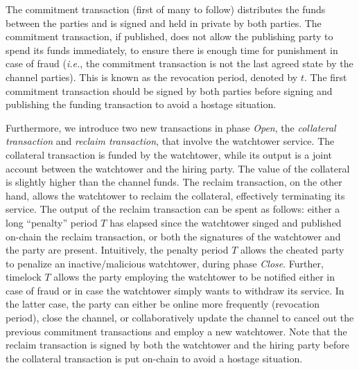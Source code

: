 \documentclass[runningheads]{llncs}
\newcommand{\ie}{{\em i.e.}}
\begin{document}
The commitment transaction (first of many to follow) distributes the funds between the  parties and is signed and held in private by both parties. The commitment transaction, if published, does not allow the publishing party to spend its funds immediately, to ensure there is enough time for punishment in case of fraud (\ie, the commitment transaction is not the last agreed state by the channel parties). This is known as the revocation period, denoted by $t$. The first commitment transaction should be signed by both parties before signing and publishing the funding transaction to avoid a hostage situation.

Furthermore, we introduce two new transactions in phase \textit{Open}, the \textit{collateral transaction} and \textit{reclaim transaction}, that involve the watchtower service.
The collateral transaction is funded by the watchtower, while its output is a joint account between the watchtower and the hiring party. The value of the collateral is slightly higher than the channel funds.
The reclaim transaction, on the other hand, allows the watchtower to reclaim the collateral, effectively terminating its service.
The output of the reclaim transaction can be spent as follows: either a long ``penalty'' period $T$ has elapsed since the watchtower singed and published on-chain the reclaim transaction, or both the signatures of the watchtower and the party are present. 
Intuitively, the penalty period $T$ allows the cheated party to penalize an inactive/malicious watchtower, during phase \textit{Close}. Further, timelock $T$ allows the party employing the watchtower to be notified either in case of fraud or in case the watchtower simply wants to withdraw its service. In the latter case, the party can either be online more frequently (revocation period), close the channel, or collaboratively update the channel to cancel out the previous commitment transactions and employ a new watchtower. 
Note that the reclaim transaction is signed by both the watchtower and the hiring party before the collateral transaction is put on-chain to avoid a hostage situation.
\end{document}
